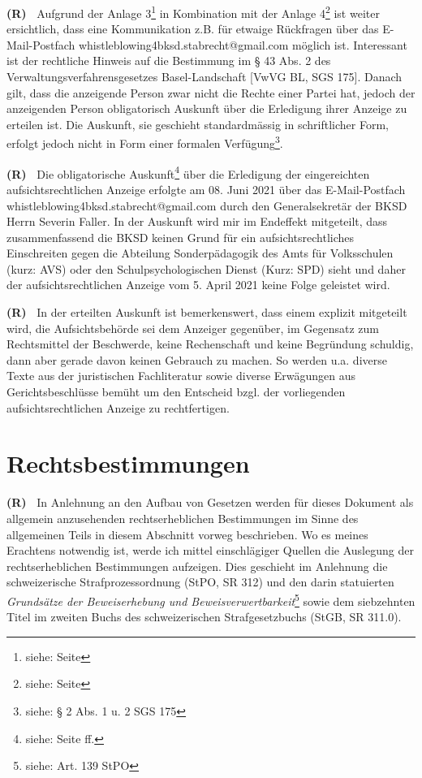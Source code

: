 \documentclass[paper=a4,fontsize=12pt, oneside, numbers=noenddot]{scrbook}
\newcounter{rz}
\newcommand{\Rz}{
	\addtocounter{rz}{1}\textbf{(R\arabic{rz})~}
}
\begin{document}
\Rz Aufgrund der Anlage 3\footnote{siehe:  Seite \pageref{NachfrageAnzeige}} in Kombination mit der Anlage 4\footnote{siehe:  Seite \pageref{AntwortNachfrageAnzeige}} ist weiter ersichtlich, dass eine Kommunikation z.B. für etwaige Rückfragen über das E-Mail-Postfach whistleblowing4bksd.stabrecht@gmail.com möglich ist. Interessant ist der rechtliche Hinweis auf die Bestimmung im § 43 Abs. 2 des Verwaltungsverfahrensgesetzes Basel-Landschaft [VwVG BL, SGS 175]. Danach gilt, dass die anzeigende Person zwar nicht die Rechte einer Partei hat, jedoch der anzeigenden Person obligatorisch Auskunft über die Erledigung ihrer Anzeige zu erteilen ist. Die Auskunft, sie geschieht  standardmässig in schriftlicher Form, erfolgt jedoch nicht in Form einer formalen Verfügung\footnote{siehe: § 2 Abs. 1 u. 2 SGS 175}.

\Rz Die obligatorische Auskunft\footnote{siehe: Seite \pageref{EntscheidAnzeige} ff.} über die Erledigung der eingereichten aufsichtsrechtlichen Anzeige erfolgte am 08. Juni 2021 über das E-Mail-Postfach whistleblowing4bksd.stabrecht@gmail.com durch den Generalsekretär der BKSD Herrn Severin Faller. In der Auskunft wird mir im Endeffekt mitgeteilt, dass zusammenfassend die BKSD keinen Grund für ein aufsichtsrechtliches Einschreiten gegen die Abteilung Sonderpädagogik des Amts für Volksschulen (kurz: AVS) oder den Schulpsychologischen Dienst (Kurz: SPD) sieht und daher der aufsichtsrechtlichen Anzeige vom 5. April 2021 keine Folge geleistet wird.

\Rz In der erteilten Auskunft ist bemerkenswert, dass einem  explizit mitgeteilt wird, die Aufsichtsbehörde sei dem Anzeiger gegenüber, im Gegensatz zum Rechtsmittel der Beschwerde, keine Rechenschaft und keine Begründung schuldig, dann aber gerade davon keinen Gebrauch zu machen. So werden u.a. diverse Texte aus der juristischen Fachliteratur sowie diverse Erwägungen aus Gerichtsbeschlüsse bemüht um den Entscheid bzgl. der vorliegenden aufsichtsrechtlichen Anzeige zu rechtfertigen.



\chapter{Rechtsbestimmungen}
\Rz In Anlehnung an den Aufbau von Gesetzen werden für dieses Dokument als allgemein anzusehenden rechtserheblichen Bestimmungen im Sinne des allgemeinen Teils in diesem Abschnitt vorweg beschrieben. Wo es meines Erachtens notwendig ist, werde ich mittel einschlägiger Quellen die Auslegung der rechtserheblichen Bestimmungen aufzeigen. Dies geschieht im Anlehnung die schweizerische Strafprozessordnung (StPO, SR 312) und den darin statuierten \textit{Grundsätze der Beweiserhebung und Beweisverwertbarkeit}\footnote{siehe: Art. 139 StPO} sowie dem siebzehnten Titel im zweiten Buchs des schweizerischen Strafgesetzbuchs (StGB, SR 311.0).
\end{document}

